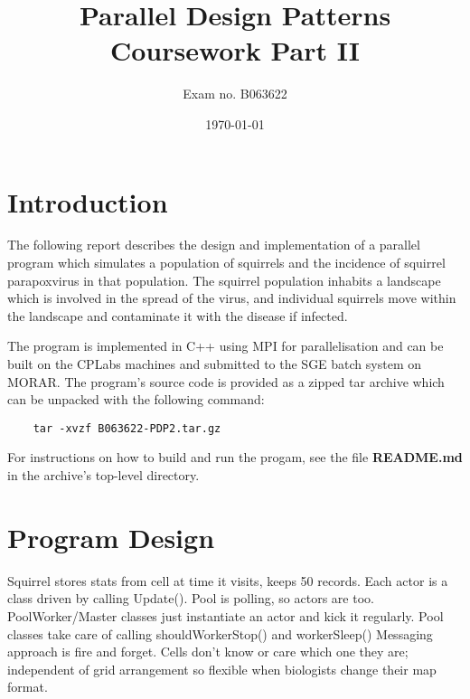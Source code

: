 \documentclass[11pt, oneside]{article}   %
\title{Parallel Design Patterns Coursework Part II}
\author{Exam no. B063622}
\date{\today}
\begin{document}
\maketitle

\newpage

\tableofcontents

\newpage


\section{Introduction}

The following report describes the design and implementation of a parallel program which simulates a population of squirrels and the incidence of squirrel parapoxvirus in that population.
The squirrel population inhabits a landscape which is involved in the spread of the virus, and individual squirrels move within the landscape and contaminate it with the disease if infected.

The program is implemented in C++ using MPI for parallelisation and can be built on the CPLabs machines and submitted to the SGE batch system on MORAR.
The program's source code is provided as a zipped tar archive which can be unpacked with the following command:

\begin{lstlisting}
	tar -xvzf B063622-PDP2.tar.gz
\end{lstlisting}

For instructions on how to build and run the progam, see the file \textbf{README.md} in the archive's top-level directory.

\newpage

\section{Program Design}
Squirrel stores stats from cell at time it visits, keeps 50 records.
Each actor is a class driven by calling Update().
Pool is polling, so actors are too.
PoolWorker/Master classes just instantiate an actor and kick it regularly.
Pool classes take care of calling shouldWorkerStop() and workerSleep()
Messaging approach is fire and forget.
Cells don't know or care which one they are; independent of grid arrangement so flexible when biologists change their map format.
\end{document}
